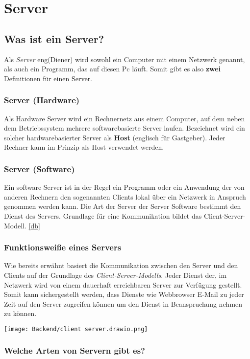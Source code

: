 \section{Server}

\subsection{Was ist ein Server?}
Als \textit{Server} eng(Diener) wird sowohl ein Computer mit einem Netzwerk genannt,
als auch ein Programm, das auf diesen Pc läuft. Somit gibt es also \textbf{zwei} Definitionen
für einen Server.

\subsubsection{Server (Hardware)}
Als Hardware Server wird ein Rechnernetz aus einem Computer, auf dem neben dem Betriebssystem
mehrere softwarebasierte Server laufen. Bezeichnet wird ein solcher hardwarebasierter
Server als \textbf{Host} (englisch für Gastgeber). Jeder Rechner kann im Prinzip als Host verwendet
werden.

\subsubsection{Server (Software)}
Ein software Server ist in der Regel ein Programm oder ein Anwendung
der von anderen Rechnern den sogenannten Clients lokal über ein Netzwerk in Anspruch genommen
werden kann. Die Art der Server der Server Software bestimmt den Dienst des Servers. Grundlage für
eine Kommunikation bildet das Client-Server-Modell. \ref{db}

\subsubsection{Funktionsweiße eines Servers}
Wie bereits erwähnt basiert die Kommunikation zwischen den Server und den Clients
auf der Grundlage des \textit{Client-Server-Modells}. Jeder Dienst der, im Netzwerk wird von
einem dauerhaft erreichbaren Server zur Verfügung gestellt. Somit kann sichergestellt werden, dass
Dienste wie Webbrowser E-Mail zu jeder Zeit auf den Server zugreifen können um den Dienst
in Beanspruchung nehmen zu können.

\texttt{[image: Backend/client server.drawio.png]}
\subsubsection{Welche Arten von Servern gibt es?}
